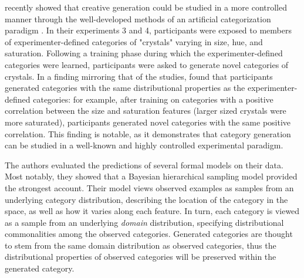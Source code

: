 \documentclass[12pt]{article}
\newcommand\jlanote[1]{\todo[inline, backgroundcolor = lime]{\textbf{JLA}: #1}}
\begin{document}
\begin{flushleft}
\cite{jern2013probabilistic} recently showed that creative generation could be studied in a more controlled manner through the well-developed methods of an artificial categorization paradigm \citep[see][]{kurtz2015human}. In their experiments 3 and 4, participants were exposed to members of experimenter-defined categories of "crystals" varying in size, hue, and saturation. Following a training phase during which the experimenter-defined categories were learned, participants were asked to generate novel categories of crystals. In a finding mirroring that of the \cite{ward1994structured} studies, \citeauthor{jern2013probabilistic} found that participants generated categories with the same distributional properties as the experimenter-defined categories: for example, after training on categories with a positive correlation between the size and saturation features (larger sized crystals were more saturated), participants generated novel categories with the same positive correlation. This finding is notable, as it demonstrates that category generation can be studied in a well-known and highly controlled experimental paradigm.

The authors evaluated the predictions of several formal models on their data. Most notably, they showed that a Bayesian hierarchical sampling model provided the strongest account. Their model views observed examples as samples from an underlying category distribution, describing the location of the category in the space, as well as how it varies along each feature. In turn, each category is viewed as a sample from an underlying \textit{domain} distribution, specifying distributional commonalities among the observed categories. Generated categories are thought to stem from the same domain distribution as observed categories, thus the distributional properties of observed categories will be preserved within the generated category.




\end{flushleft}
\end{document}
